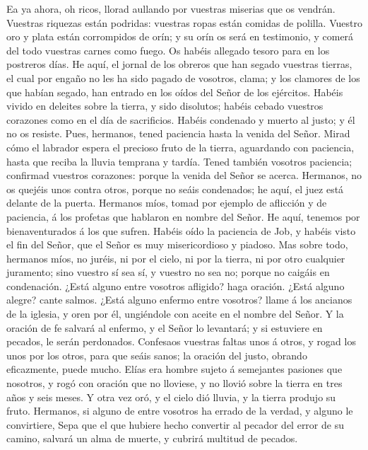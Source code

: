  Ea ya ahora, oh ricos, llorad aullando por vuestras
miserias que os vendrán.  Vuestras riquezas están podridas:
vuestras ropas están comidas de polilla.  Vuestro oro y
plata están corrompidos de orín; y su orín os será en testimonio, y
comerá del todo vuestras carnes como fuego. Os habéis allegado tesoro
para en los postreros días.  He aquí, el jornal de los
obreros que han segado vuestras tierras, el cual por engaño no les ha
sido pagado de vosotros, clama; y los clamores de los que habían segado,
han entrado en los oídos del Señor de los ejércitos.  Habéis
vivido en deleites sobre la tierra, y sido disolutos; habéis cebado
vuestros corazones como en el día de sacrificios.  Habéis
condenado y muerto al justo; y él no os resiste.  Pues,
hermanos, tened paciencia hasta la venida del Señor. Mirad cómo el
labrador espera el precioso fruto de la tierra, aguardando con
paciencia, hasta que reciba la lluvia temprana y tardía. 
Tened también vosotros paciencia; confirmad vuestros corazones: porque
la venida del Señor se acerca.  Hermanos, no os quejéis unos
contra otros, porque no seáis condenados; he aquí, el juez está delante
de la puerta.  Hermanos míos, tomad por ejemplo de
aflicción y de paciencia, á los profetas que hablaron en nombre del
Señor.  He aquí, tenemos por bienaventurados á los que
sufren. Habéis oído la paciencia de Job, y habéis visto el fin del
Señor, que el Señor es muy misericordioso y piadoso.  Mas
sobre todo, hermanos míos, no juréis, ni por el cielo, ni por la tierra,
ni por otro cualquier juramento; sino vuestro sí sea sí, y vuestro no
sea no; porque no caigáis en condenación.  ¿Está alguno
entre vosotros afligido? haga oración. ¿Está alguno alegre? cante
salmos.  ¿Está alguno enfermo entre vosotros? llame á los
ancianos de la iglesia, y oren por él, ungiéndole con aceite en el
nombre del Señor.  Y la oración de fe salvará al enfermo, y
el Señor lo levantará; y si estuviere en pecados, le serán perdonados.
 Confesaos vuestras faltas unos á otros, y rogad los unos
por los otros, para que seáis sanos; la oración del justo, obrando
eficazmente, puede mucho.  Elías era hombre sujeto á
semejantes pasiones que nosotros, y rogó con oración que no lloviese, y
no llovió sobre la tierra en tres años y seis meses.  Y
otra vez oró, y el cielo dió lluvia, y la tierra produjo su fruto.
 Hermanos, si alguno de entre vosotros ha errado de la
verdad, y alguno le convirtiere,  Sepa que el que hubiere
hecho convertir al pecador del error de su camino, salvará un alma de
muerte, y cubrirá multitud de pecados.
